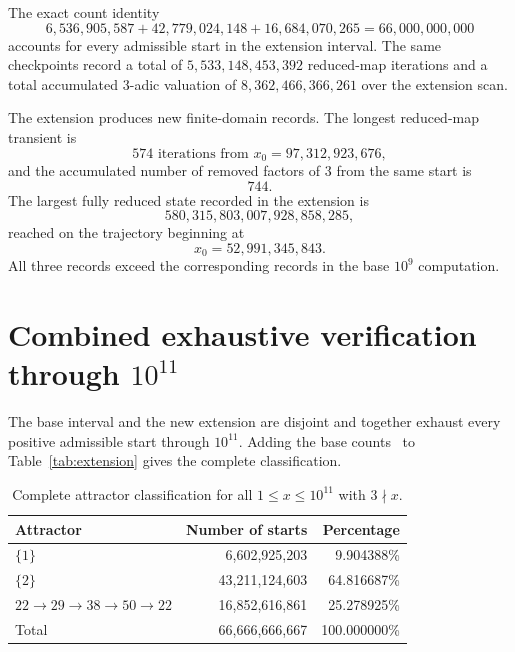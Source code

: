 \documentclass[11pt]{article}
\begin{document}
The exact count identity
\[
6,536,905,587+42,779,024,148+16,684,070,265=66,000,000,000
\]
accounts for every admissible start in the extension interval.  The same checkpoints record a total of $5,533,148,453,392$ reduced-map iterations and a total accumulated $3$-adic valuation of $8,362,466,366,261$ over the extension scan.

The extension produces new finite-domain records.  The longest reduced-map transient is
\begin{equation}
\boxed{574\text{ iterations from }x_0=97,312,923,676,}
\end{equation}
and the accumulated number of removed factors of $3$ from the same start is
\begin{equation}
\boxed{744.}
\end{equation}
The largest fully reduced state recorded in the extension is
\begin{equation}
\boxed{580,315,803,007,928,858,285,}
\end{equation}
reached on the trajectory beginning at
\begin{equation}
\boxed{x_0=52,991,345,843.}
\end{equation}
All three records exceed the corresponding records in the base $10^9$ computation.

\section{Combined exhaustive verification through $10^{11}$}
The base interval and the new extension are disjoint and together exhaust every positive admissible start through $10^{11}$.  Adding the base counts~\cite{banazadeh2026base} to Table~\ref{tab:extension} gives the complete classification.

\begin{table}[ht]
\centering
\caption{Complete attractor classification for all $1\le x\le10^{11}$ with $3\nmid x$.}
\label{tab:1e11}
\begin{tabular}{lrr}
\toprule
Attractor & Number of starts & Percentage\\
\midrule
$\{1\}$ & 6,602,925,203 & 9.904388\%\\
$\{2\}$ & 43,211,124,603 & 64.816687\%\\
$22\to29\to38\to50\to22$ & 16,852,616,861 & 25.278925\%\\
\midrule
Total & 66,666,666,667 & 100.000000\%\\
\bottomrule
\end{tabular}
\end{table}
\end{document}

